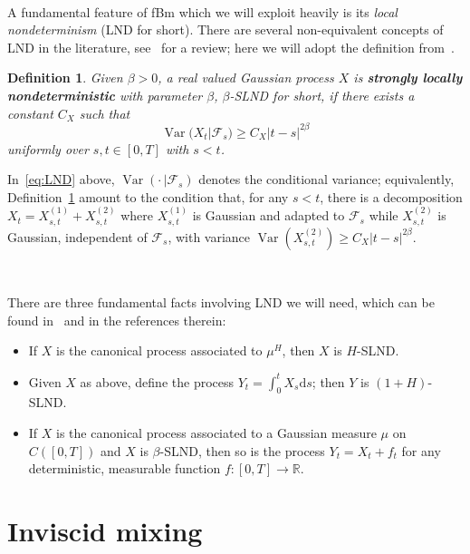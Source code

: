 \documentclass[11pt,oneside,reqno]{amsart}
\newcommand{\mathd}{\mathrm{d}}
\newcommand{\tmdfn}[1]{\textbf{#1}}
\newcommand{\tmop}[1]{\ensuremath{\operatorname{#1}}}
\newcommand{\tmtextit}[1]{{{\itshape{#1}}}}
\newtheorem{definition}[theorem]{Definition}
\numberwithin{equation}{section}
\begin{document}
\

A fundamental feature of fBm which we will exploit heavily is its
\tmtextit{local nondeterminism} (LND for short). There are several
non-equivalent concepts of LND in the literature, see~{\cite{xiao}} for a
review; here we will adopt the definition from~{\cite{galeati2020prevalence}}.

\begin{definition}
  \label{def:LND}Given $\beta > 0$, a real valued Gaussian process $X$ is
  {\tmdfn{strongly locally nondeterministic}} with parameter $\beta$,
  $\beta$-SLND for short, if there exists a constant $C_X$ such that
  \begin{equation}
    \tmop{Var} (X_t | \mathcal{F}_s) \geqslant C_X  | t - s |^{2 \beta}
    \label{eq:LND}
  \end{equation}
  uniformly over $s, t \in [0, T]$ with $s < t$.
\end{definition}

In~\eqref{eq:LND} above, $\tmop{Var} \left( \cdot \, | \mathcal{F}_s \right)$
denotes the conditional variance; equivalently, Definition~\ref{def:LND}
amount to the condition that, for any $s < t$, there is a decomposition $X_t =
X^{(1)}_{s, t} + X^{(2)}_{s, t}$ where $X^{(1)}_{s, t}$ is Gaussian and
adapted to $\mathcal{F}_s$ while $X^{(2)}_{s, t}$ is Gaussian, independent of
$\mathcal{F}_s$, with variance $\tmop{Var} (X^{(2)}_{s, t}) \geqslant C_X  | t
- s |^{2 \beta}$.

\

There are three fundamental facts involving LND we will need, which can be
found in~{\cite{galeati2020prevalence}} and in the references therein:
\begin{itemize}
  \item If $X$ is the canonical process associated to $\mu^H$, then $X$ is
  $H$-SLND.
  
  \item Given $X$ as above, define the process $Y_t = \int_0^t X_s \mathd s$;
  then $Y$ is $(1 + H)$-SLND.
  
  \item If $X$ is the canonical process associated to a Gaussian measure $\mu$
  on $C ([0, T])$ and $X$ is $\beta$-SLND, then so is the process $Y_t = X_t +
  f_t$ for any deterministic, measurable function $f : [0, T] \rightarrow
  \mathbb{R}$.
\end{itemize}
\section{Inviscid mixing}\label{sec:inviscid-mixing}
\end{document}
